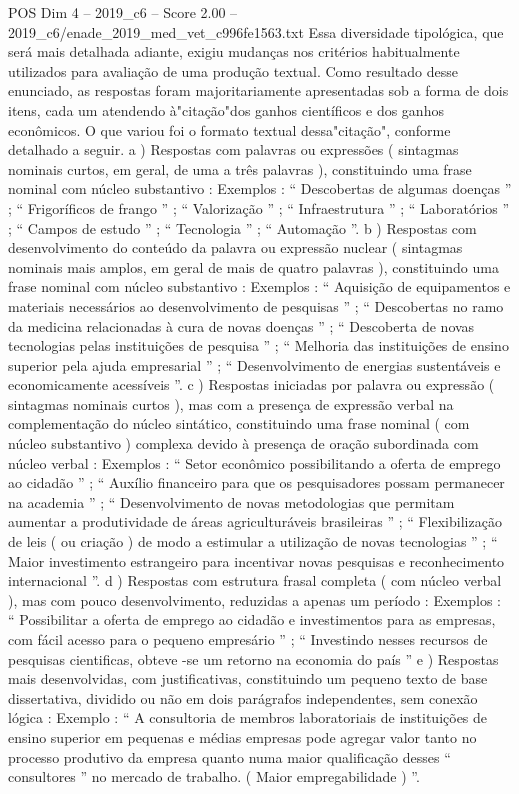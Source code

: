 \begin{textsample}{POS Dim 4 – 2019\_c6 – Score 2.00 – 2019\_c6/enade\_2019\_med\_vet\_c996fe1563.txt}
Essa diversidade tipológica, que será mais detalhada adiante, exigiu mudanças nos critérios habitualmente utilizados para avaliação de uma produção textual.
Como resultado desse enunciado, as respostas foram majoritariamente apresentadas sob a forma de dois itens, cada um atendendo à"citação"dos ganhos científicos e dos ganhos econômicos.
O que variou foi o formato textual dessa"citação", conforme detalhado a seguir. a ) Respostas com palavras ou expressões ( sintagmas nominais curtos, em geral, de uma a três palavras ), constituindo uma frase nominal com núcleo substantivo : Exemplos : “ Descobertas de algumas doenças ” ; “ Frigoríficos de frango ” ; “ Valorização ” ; “ Infraestrutura ” ; “ Laboratórios ” ; “ Campos de estudo ” ; “ Tecnologia ” ; “ Automação ”. b ) Respostas com desenvolvimento do conteúdo da palavra ou expressão nuclear ( sintagmas nominais mais amplos, em geral de mais de quatro palavras ), constituindo uma frase nominal com núcleo substantivo : Exemplos : “ Aquisição de equipamentos e materiais necessários ao desenvolvimento de pesquisas ” ; “ Descobertas no ramo da medicina relacionadas à cura de novas doenças ” ; “ Descoberta de novas tecnologias pelas instituições de pesquisa ” ; “ Melhoria das instituições de ensino superior pela ajuda empresarial ” ; “ Desenvolvimento de energias sustentáveis e economicamente acessíveis ”. c ) Respostas iniciadas por palavra ou expressão ( sintagmas nominais curtos ), mas com a presença de expressão verbal na complementação do núcleo sintático, constituindo uma frase nominal ( com núcleo substantivo ) complexa devido à presença de oração subordinada com núcleo verbal : Exemplos : “ Setor econômico possibilitando a oferta de emprego ao cidadão ” ; “ Auxílio financeiro para que os pesquisadores possam permanecer na academia ” ; “ Desenvolvimento de novas metodologias que permitam aumentar a produtividade de áreas agriculturáveis brasileiras ” ; “ Flexibilização de leis ( ou criação ) de modo a estimular a utilização de novas tecnologias ” ; “ Maior investimento estrangeiro para incentivar novas pesquisas e reconhecimento internacional ”. d ) Respostas com estrutura frasal completa ( com núcleo verbal ), mas com pouco desenvolvimento, reduzidas a apenas um período : Exemplos : “ Possibilitar a oferta de emprego ao cidadão e investimentos para as empresas, com fácil acesso para o pequeno empresário ” ; “ Investindo nesses recursos de pesquisas cientificas, obteve -se um retorno na economia do país ” e ) Respostas mais desenvolvidas, com justificativas, constituindo um pequeno texto de base dissertativa, dividido ou não em dois parágrafos independentes, sem conexão lógica : Exemplo : “ A consultoria de membros laboratoriais de instituições de ensino superior em pequenas e médias empresas pode agregar valor tanto no processo produtivo da empresa quanto numa maior qualificação desses “ consultores ” no mercado de trabalho. ( Maior empregabilidade ) ”.

\end{textsample}
